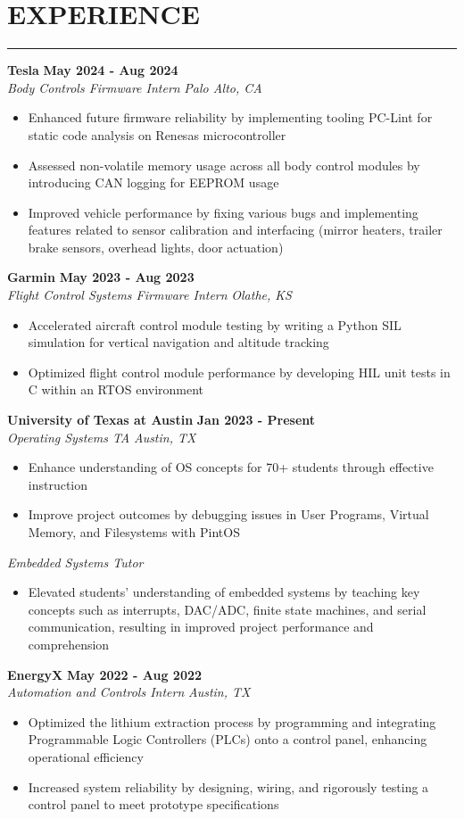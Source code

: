 \documentclass[10pt]{article}
\newcommand{\sectionHeader}[1]{%
    \vspace{-1.25\baselineskip}
    \section*{\large \MakeUppercase{#1}}
    \vspace{-1.5\baselineskip}
    \color{teal}
    \rule{\textwidth}{1.5pt} %
    \color{black}
    \vspace{-1.25\baselineskip}
    \pdfbookmark[1]{#1}{#1}
}
\newcommand{\role}[3]{
    \textit{#1} \hfill \textit{#2} \\[0pt]
    #3
}
\newcommand{\sectionItem}[5]{ %
    \textbf{#1} \hfill \textbf{#2} \\[0pt]
    \role{#3}{#4}{#5}    %
}
\begin{document}
\sectionHeader{Experience}
\begin{flushleft}
    \sectionItem{Tesla}{May 2024 - Aug 2024}{Body Controls Firmware Intern}{Palo Alto, CA}{
        \begin{itemize}
            \item Enhanced future firmware reliability by implementing tooling PC-Lint for static code analysis on Renesas microcontroller
            \item Assessed non-volatile memory usage across all body control modules by introducing CAN logging for EEPROM usage
            \item Improved vehicle performance by fixing various bugs and implementing features related to sensor calibration and interfacing (mirror heaters, trailer brake sensors, overhead lights, door actuation)     
        \end{itemize}
    }
    
    \sectionItem{Garmin}{May 2023 - Aug 2023}{Flight Control Systems Firmware Intern}{Olathe, KS}{
        \begin{itemize}
            \item Accelerated aircraft control module testing by writing a Python SIL simulation for vertical navigation and altitude tracking
            \item Optimized flight control module performance by developing HIL unit tests in C within an RTOS environment
        \end{itemize}
    }

    \sectionItem{University of Texas at Austin}{Jan 2023 - Present}{Operating Systems TA}{Austin, TX}{
        \begin{itemize}
            \item Enhance understanding of OS concepts for 70+ students through effective instruction
            \item Improve project outcomes by debugging issues in User Programs, Virtual Memory, and Filesystems with PintOS
        \end{itemize}
        \role{Embedded Systems Tutor}{}{
            \begin{itemize}
                \item Elevated students' understanding of embedded systems by teaching key concepts such as interrupts, DAC/ADC, finite state machines, and serial communication, resulting in improved project performance and comprehension
            \end{itemize}
        }
    }

    \sectionItem{EnergyX}{May 2022 - Aug 2022}{Automation and Controls Intern}{Austin, TX}{
        \begin{itemize}
            \item Optimized the lithium extraction process by programming and integrating Programmable Logic Controllers (PLCs) onto a control panel, enhancing operational efficiency
            \item Increased system reliability by designing, wiring, and rigorously testing a control panel to meet prototype specifications
        \end{itemize}
    }
\end{flushleft}
\end{document}
